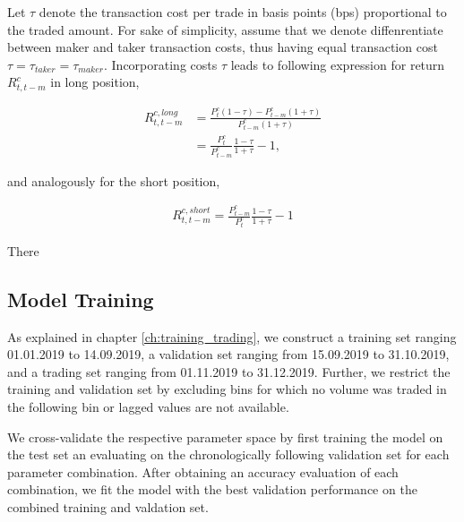 Let $ \tau $ denote the transaction cost per trade in basis points (bps) proportional to the traded amount.
For sake of simplicity, assume that we denote diffenrentiate between maker and taker transaction costs,
thus having equal transaction cost $ \tau = \tau_{taker} = \tau_{maker} $.
Incorporating costs $\tau$ leads to following expression for return $ R_{t, t-m}^{c} $ in long position,

\begin{equation} \label{eq:return_transaction_cost_long}
\begin{aligned}
    R_{t, t-m}^{c, long} &= \frac{ P_{t}^{c}(1 - \tau) - P_{t - m}^{c}(1 + \tau) }{ P_{t - m}^{c}(1 + \tau) }\\
    &= \frac{ P_{t}^{c} }{ P_{t - m}^{c} } \frac{ 1 - \tau }{ 1 + \tau } - 1,
\end{aligned}
\end{equation}

and analogously for the short position,

\begin{equation} \label{eq:return_transaction_cost_short}
    \begin{aligned}
        R_{t, t-m}^{c, short} = \frac{ P_{t - m}^{c} }{ P_{t}^{c} } \frac{ 1 - \tau }{ 1 + \tau } - 1
    \end{aligned}
\end{equation}

There


\subsection{Model Training}
As explained in chapter \ref{ch:training_trading}, we construct a training set ranging 01.01.2019 to 14.09.2019, 
a validation set ranging from 15.09.2019 to 31.10.2019, and a trading set ranging from 01.11.2019 to 31.12.2019.
Further, we restrict the training and validation set by excluding bins for which no volume 
was traded in the following bin or lagged values are not available.


We cross-validate the respective parameter space by first training the model
on the test set an evaluating on the chronologically following validation set for each parameter combination.
After obtaining an accuracy evaluation of each combination, we fit the model with the best validation performance on
the combined training and valdation set.

